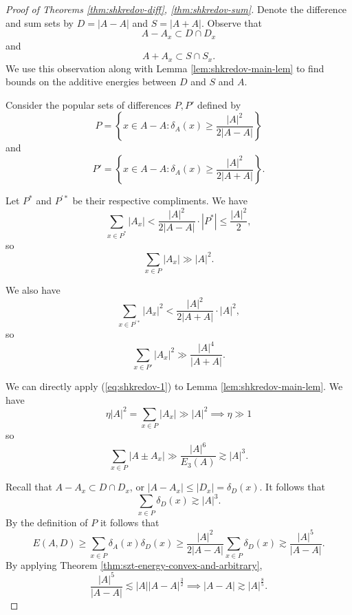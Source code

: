 \documentclass[12pt,reqno]{amsart}
\begin{document}
\begin{proof}[Proof of Theorems \ref{thm:shkredov-diff}, \ref{thm:shkredov-sum}]
Denote the difference and sum sets by \(D = \left\lvert A-A \right\rvert \) and \(S = \left\lvert A+A \right\rvert \).
Observe that
\[
    A - A_{x} \subset D \cap D_{x} 
\]
and
\[
    A + A_{x} \subset S \cap S_{x} 
.\]
We use this observation along with Lemma \ref{lem:shkredov-main-lem} to find bounds on
the additive energies between \(D\) and \(S\) and \(A\).

Consider the popular sets of differences \(P,P'\) defined by
\[
    P = \left\{ x \in A - A : \delta_{A} (x) \geq \frac{\left\lvert A \right\rvert ^{2}}{2 \left\lvert A-A \right\rvert }  \right\} 
\]
and
\[
    P ' = \left\{ x \in A-A : \delta_{A} (x) \geq \frac{\left\lvert A \right\rvert ^{2}}{2\left\lvert A + A \right\rvert }  \right\} 
.\]

Let \(P^{*}\) and \(P^{'*}\) be their respective compliments. We have
\[
    \sum _{x \in P^{*}} \left\lvert A_{x} \right\rvert < \frac{\left\lvert A \right\rvert ^{2}}{2 \left\lvert A-A \right\rvert } \cdot  \left\lvert P^{*} \right\rvert \leq \frac{\left\lvert A \right\rvert ^{2}}{2} 
,\]
so
\begin{equation} \label{eq:shkredov-1}
    \sum _{x \in P} \left\lvert A_{x}  \right\rvert \gg \left\lvert A \right\rvert ^{2}
    .
\end{equation}

We also have
\[
    \sum _{x \in P ^{'*}} \left\lvert A_{x}  \right\rvert ^{2} < \frac{\left\lvert A \right\rvert ^{2}}{2 \left\lvert A+A \right\rvert } \cdot \left\lvert A \right\rvert ^{2}
,\]
so
\[
    \sum _{x \in P'} \left\lvert A_{x}  \right\rvert ^{2} \gg \frac{\left\lvert A \right\rvert ^{4}}{\left\lvert A+A \right\rvert } 
.\]

We can directly apply (\ref{eq:shkredov-1}) to Lemma \ref{lem:shkredov-main-lem}. We have
\[
    \eta \left\lvert A \right\rvert ^{2} = \sum _{x \in P} \left\lvert A_{x}  \right\rvert \gg \left\lvert A \right\rvert ^{2} \implies \eta \gg 1
\]
so
\[
    \sum _{x \in P} \left\lvert A \pm  A_{x}  \right\rvert \gg \frac{\left\lvert A \right\rvert ^{6}}{E_{3} (A)} \gtrsim \left\lvert A \right\rvert ^{3}
.\]

Recall that \(A - A_{x} \subset D \cap D_{x} \), or \(\left\lvert A - A_{x}  \right\rvert \leq \left\lvert D_{x}  \right\rvert = \delta_{D} (x)\). It follows that
\[
    \sum _{x \in P} \delta_{D} (x) \gtrsim \left\lvert A \right\rvert ^{3}
.\]
By the definition of \(P\) it follows that
\[
    E(A,D) \geq \sum _{x \in P} \delta_{A} (x)\delta_{D} (x) \geq \frac{\left\lvert A \right\rvert ^{2}}{2 \left\lvert A-A \right\rvert } \sum _{x \in P} \delta_{D} (x) \gtrsim \frac{\left\lvert A \right\rvert ^{5}}{\left\lvert A-A \right\rvert }
.\]
By applying Theorem \ref{thm:szt-energy-convex-and-arbitrary},
\[
    \frac{\left\lvert A \right\rvert ^{5}}{\left\lvert A-A \right\rvert } \lesssim \left\lvert A \right\rvert \left\lvert A-A \right\rvert ^{\frac{3}{2} } \implies \left\lvert A-A \right\rvert \gtrsim \left\lvert A \right\rvert ^{\frac{8}{5} }
.\]


\end{proof}
\end{document}
